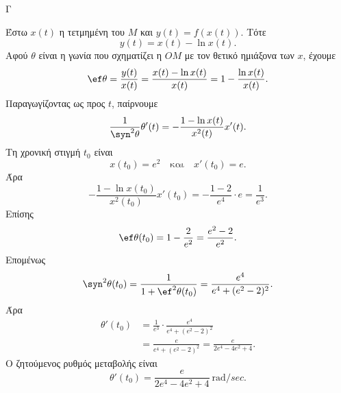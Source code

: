 \begin{thema}{Γ}
\begin{erwthma}
\item Έστω $x(t)$ η τετμημένη του $M$ και $y(t)=f(x(t))$. Τότε
\[
y(t)=x(t)-\ln x(t).
\]
Αφού $\theta$ είναι η γωνία που σχηματίζει η $OM$ με τον θετικό ημιάξονα των $x$, έχουμε
\[
\ef\theta=\frac{y(t)}{x(t)}
=\frac{x(t)-\ln x(t)}{x(t)}
=1-\frac{\ln x(t)}{x(t)}.
\]
Παραγωγίζοντας ως προς $t$, παίρνουμε
\[
\frac{1}{\syn^2\theta}\theta'(t)
=-\frac{1-\ln x(t)}{x^2(t)}x'(t).
\]
Τη χρονική στιγμή $t_0$ είναι
\[
x(t_0)=e^2
\quad\text{και}\quad
x'(t_0)=e.
\]
Άρα
\[
-\frac{1-\ln x(t_0)}{x^2(t_0)}x'(t_0)
=-\frac{1-2}{e^4}\cdot e
=\frac{1}{e^3}.
\]
Επίσης
\[
\ef\theta(t_0)=1-\frac{2}{e^2}=\frac{e^2-2}{e^2}.
\]
Επομένως
\[
\syn^2\theta(t_0)
=\frac{1}{1+\ef^2\theta(t_0)}
=\frac{e^4}{e^4+(e^2-2)^2}.
\]
Άρα
\begin{align*}
\theta'(t_0)
&=\frac{1}{e^3}\cdot\frac{e^4}{e^4+(e^2-2)^2}\\
&=\frac{e}{e^4+(e^2-2)^2}
=\frac{e}{2e^4-4e^2+4}.
\end{align*}
Ο ζητούμενος ρυθμός μεταβολής είναι
\[
{\theta'(t_0)=\frac{e}{2e^4-4e^2+4}\ \text{rad}/\si{sec}}.
\]
\end{erwthma}
\end{thema}

